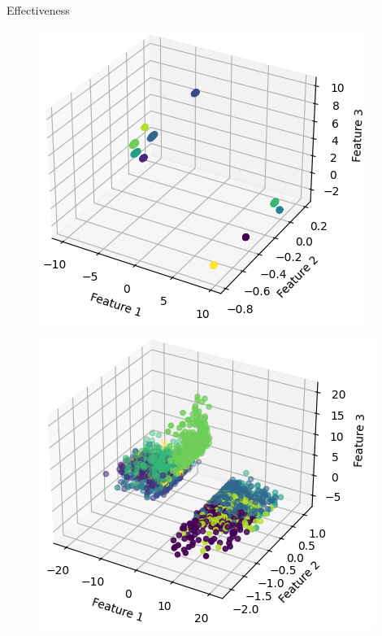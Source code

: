 \documentclass[aspectratio=169]{beamer}
[aspectratio=169] %
\begin{document}
\begin{frame}{Effectiveness}
  \begin{minipage}{0.49\textwidth}
    \begin{figure}
      \centering
      \includegraphics[height=0.65\textheight]{figures/knn_before.png}
    \end{figure}
  \end{minipage}
  \hfill
  \begin{minipage}{0.49\textwidth}
    \begin{figure}
      \centering
      \includegraphics[height=0.65\textheight]{figures/knn_after.png}
    \end{figure}
  \end{minipage}
\end{frame}
\end{document}

